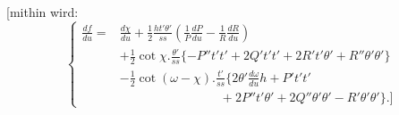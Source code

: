 [mithin wird:
\begin{equation}\tag*{[21]}
\left\{\begin{aligned}
\frac{df}{du}={}&\frac{d\chi}{du}+\tfrac12\frac{ht'\theta'}{ss}\left(\frac1P\frac{dP}{du}-\frac1R\frac{dR}{du}\right)\\
&+\tfrac12\cot\chi.\frac{\theta'}{ss}\{-P''t't'+2Q't't'+2R't'\theta'+R''\theta'\theta'\}\\
&-\tfrac12\cot(\omega-\chi).\frac{t'}{ss}\{2\theta'\frac{d\omega}{du}h+P't't'\\
&\hspace{8em}+2P''t'\theta'+2Q''\theta'\theta'-R'\theta'\theta'\}.]
\end{aligned}\right.
\end{equation}
